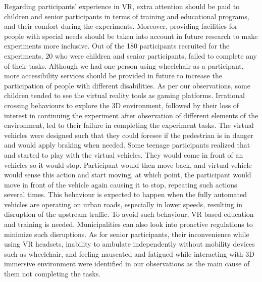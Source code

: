 Regarding participants' experience in VR, extra attention should be paid to children and senior participants in terms of training and educational programs, and their comfort during the experiments. Moreover, providing facilities for people with special needs should be taken into account in future research to make experiments more inclusive. Out of the 180 participants recruited for the experiments, 20 who were children and senior participants, failed to complete any of their tasks. Although we had one person using wheelchair as a participant, more accessibility services should be provided in future to increase the participation of people with different disabilities. As per our observations, some children tended to see the virtual reality tools as gaming platforms. Irrational crossing behaviours to explore the 3D environment, followed by their loss of interest in continuing the experiment after observation of different elements of the environment, led to their failure in completing the experiment tasks. The virtual vehicles were designed such that they could foresee if the pedestrian is in danger and would apply braking when needed. Some teenage participants realized that and started to play with the virtual vehicles. They would come in front of an vehicles so it would stop. Participant would then move back, and virtual vehicle would sense this action and start moving, at which point, the participant would move in front of the vehicle again causing it to stop, repeating such actions several times. This behaviour is expected to happen when the fully automated vehicles are operating on urban roads, especially in lower speeds, resulting in disruption of the upstream traffic. To avoid such behaviour, VR based education and training is needed. Municipalities can also look into proactive regulations to minimize such disruptions. As for senior participants, their inconvenience while using VR headsets, inability to ambulate independently without mobility devices such as wheelchair, and feeling nauseated and fatigued while interacting with 3D immersive environment were identified in our observations as the main cause of them not completing the tasks.

